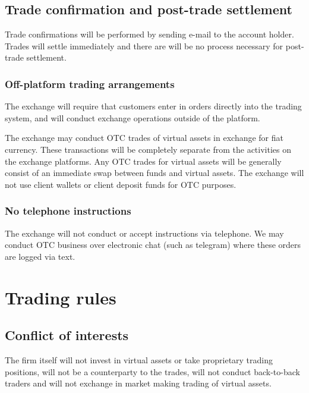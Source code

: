 \subsection{Trade confirmation and post-trade settlement}

Trade confirmations will be performed by sending e-mail to the account
holder.  Trades will settle immediately and there are will be no
process necessary for post-trade settlement.

\subsubsection{Off-platform trading arrangements}
The exchange will require that customers enter in orders directly into
the trading system, and will conduct exchange operations outside of
the platform.

The exchange may conduct OTC trades of virtual assets in exchange for
fiat currency.  These transactions will be completely separate from
the activities on the exchange platforms.  Any OTC trades for virtual
assets will be generally consist of an immediate swap between funds
and virtual assets.  The exchange will not use client wallets or
client deposit funds for OTC purposes.

\subsubsection{No telephone instructions}
The exchange will not conduct or accept instructions via telephone.
We may conduct OTC business over electronic chat (such as telegram) where
these orders are logged via text.

\section{Trading rules}

\subsection{Conflict of interests}
The firm itself will not invest in virtual assets or take proprietary
trading positions, will not be a counterparty to the trades, will not
conduct back-to-back traders and will not exchange in market making
trading of virtual assets.

